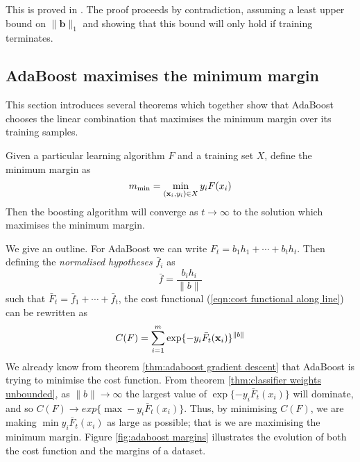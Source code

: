 \proof This is proved in \cite{Breiman97}.  The proof proceeds by
contradiction, assuming a least upper bound on $\|\mathbf{b}\|_1$ and
showing that this bound will only hold if training terminates.


\subsection{AdaBoost maximises the minimum margin}

This section introduces several theorems which together show that
AdaBoost chooses the linear combination that maximises the minimum
margin over its training samples.

\begin{theorem}
\label{thm:maximises minimmum margin}
Given a particular learning algorithm $F$ and a training set $X$,
define the minimum margin as
\[
m_{\min} = \min_{(\mathbf{x}_i,y_i) \in X} y_i F(x_i)
\]
Then the boosting algorithm will converge as $t \rightarrow \infty$ to
the solution which maximises the minimum margin.
\end{theorem}

\proof We give an outline.  For AdaBoost we can write $F_t = b_1 h_1 +
\cdots + b_t h_t$. Then defining the \emph{normalised hypotheses}
$\bar{f}_i$ as 
%
\begin{equation}
\bar{f} = \frac{b_i h_i}{\|b\|}
\end{equation}
%
such that $\bar{F}_t = \bar{f}_1 + \cdots + \bar{f}_t$, the cost
functional (\ref{eqn:cost functional along line}) can be rewritten as
%
\begin{equation}
C(F) = \sum_{i=1}^{m} \exp\{-y_i \bar{F}_t(\mathbf{x}_i)\}^{\|b\|}
\end{equation}
%
We already know from theorem \ref{thm:adaboost gradient descent} that
AdaBoost is trying to minimise the cost function.  From theorem
\ref{thm:classifier weights unbounded}, as $\|b\| \rightarrow \infty$
the largest value of $\exp\{-y_i \bar{F}_t(x_i)\}$ will dominate, and
so $C(F) \rightarrow exp\{\max -y_i \bar{F}_t(x_i)\}$.  Thus, by
minimising $C(F)$, we are making $\min y_i \bar{F}_t(x_i)$ as large as
possible; that is we are maximising the minimum margin.  Figure
\ref{fig:adaboost margins} illustrates the evolution of both the cost
function and the margins of a dataset.

